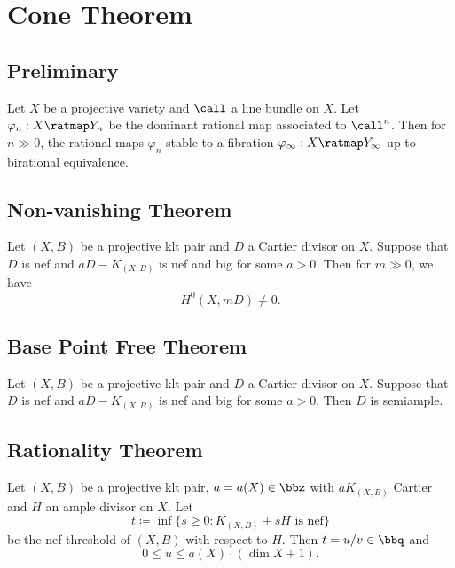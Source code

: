 \section{Cone Theorem}


\subsection{Preliminary}

    \begin{theorem}\label{thm: Iitaka fibration}
        Let \(X\) be a projective variety and \(\call\) a line bundle on \(X\).
        Let \(\varphi_n: X \ratmap Y_n\) be the dominant rational map associated to \(\call^n\).
        Then for \(n \gg 0\), the rational maps \(\varphi_n\) stable to a fibration \(\varphi_\infty: X \ratmap Y_\infty\) up to birational equivalence.
    \end{theorem}


\subsection{Non-vanishing Theorem}

    \begin{theorem}\label{thm: non-vanishing theorem}
        Let \((X,B)\) be a projective klt pair and \(D\) a Cartier divisor on \(X\).
        Suppose that \(D\) is nef and \(aD-K_{(X,B)}\) is nef and big for some \(a > 0\).
        Then for \(m \gg 0\), we have 
        \[ H^0(X,mD) \neq 0. \]
    \end{theorem}


\subsection{Base Point Free Theorem}

    \begin{theorem}\label{thm: base point free theorem}
        Let \((X,B)\) be a projective klt pair and \(D\) a Cartier divisor on \(X\).
        Suppose that \(D\) is nef and \(aD-K_{(X,B)}\) is nef and big for some \(a > 0\).
        Then \(D\) is semiample.
    \end{theorem}


\subsection{Rationality Theorem}

    \begin{theorem}\label{thm: rationality theorem}
        Let \((X,B)\) be a projective klt pair, \(a = a(X) \in \bbz\) with \(aK_{(X,B)}\) Cartier and \(H\) an ample divisor on \(X\).
        Let 
        \[ t \coloneqq \inf \{s \geq 0: K_{(X,B)} + sH \text{ is nef}\} \]
        be the nef threshold of \((X,B)\) with respect to \(H\).
        Then \(t = u/v \in \bbq\) and 
        \[ 0 \leq u \leq a(X)\cdot (\dim X + 1). \]
    \end{theorem}


